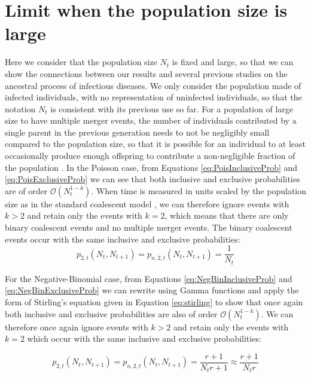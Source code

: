 \documentclass{article}
\renewcommand{\eqref}[1]{\ref{#1}}
\begin{document}
\section{Limit when the population size is large}
 
Here we consider that the population size $N_t$ is fixed and large, so that 
we can show the connections
between our results and several previous studies on the ancestral process of infectious diseases.
We only consider the population made of infected individuals, with no representation of uninfected individuals, 
so that the notation $N_t$ is consistent with its previous use so far.
For a population of large size to have multiple merger events, the number of individuals
contributed by a single parent in the previous generation needs to not be negligibly small compared
to the population size, so that it is possible for an individual to at least occasionally produce enough 
offspring to contribute a non-negligible fraction of the population \citep{schweinsbergCoalescentProcessesObtained2003,berestyckiRecentProgressCoalescent2009}. 
In the Poisson case, from Equations \eqref{eq:PoisInclusiveProb} and \eqref{eq:PoisExclusiveProb} we can see that both inclusive and exclusive probabilities
are of order $\mathcal{O}(N_t^{1-k})$. When time is measured in units scaled by the population size
as in the standard coalescent model \citep{Kingman1982},
we can therefore ignore events with $k>2$
and retain only the events with $k=2$, which means that there are only binary coalescent events
and no multiple merger events.
The binary coalescent events occur with the same inclusive and exclusive
probabilities:
\begin{equation}
p_{2,t}(N_t, N_{t+1})=p_{n,2,t}(N_t, N_{t+1})=\frac{1}{N_t}\label{eq:poissonapprox}
\end{equation}

For the Negative-Binomial case, from Equations \eqref{eq:NegBinInclusiveProb} and \eqref{eq:NegBinExclusiveProb} we can rewrite using Gamma functions and apply the 
form of Stirling's equation given in Equation \eqref{eq:stirling} to show that 
once again both inclusive and exclusive probabilities are also of order $\mathcal{O}(N_t^{1-k})$. 
We can therefore once again ignore events with $k>2$
and retain only the events with $k=2$ which occur with the same inclusive and 
exclusive probabilities:

\begin{equation}
p_{2,t}(N_t, N_{t+1})=p_{n,2,t}(N_t, N_{t+1})=\frac{r+1}{N_t r +1} \approx \frac{r+1}{N_t r}\label{eq:negbinapprox}
\end{equation}
\end{document}
